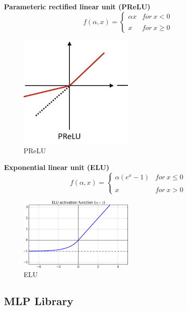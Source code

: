 \documentclass[a4paper]{article}
\begin{document}
\textbf{Parameteric rectified linear unit (PReLU)\cite{nano5}}
$$f(\alpha ,x)=\left\{\begin{matrix}
\alpha x & for\ x< 0\\ 
 & \\ 
x & for\ x\geq 0 
\end{matrix}\right.$$
\begin{figure}[H]
\centering
\includegraphics[width=0.5\textwidth, height=0.35\textwidth]{PRELU.jpg}
\caption{\label{fig:frog}PReLU}
\end{figure}
\textbf{Exponential linear unit (ELU)\cite{nano6}}
$$f(\alpha ,x)=\left\{\begin{matrix}
\alpha (e^{x}-1) & for\ x\leq  0\\ 
 & \\ 
x & for\ x>  0 
\end{matrix}\right.$$
\begin{figure}[H]
\centering
\includegraphics[width=0.5\textwidth]{ELU.png}
\caption{\label{fig:frog}ELU}
\end{figure}
\subsection{MLP Library}
\end{document}
